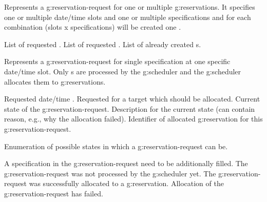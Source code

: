 \begin{Api}
Represents a \gls{g:reservation-request} for one or multiple \glspl{g:reservation}. It specifies one or multiple date/time slots and one or multiple specifications and for each combination (slots x specifications) will be created one .
\begin{ApiClassAttributes}
 List of requested .
 List of requested .
 List of already created s.
\end{ApiClassAttributes}

Represents a \gls{g:reservation-request} for single specification at one specific date/time slot.
Only s are processed by the \gls{g:scheduler} and the \gls{g:scheduler} allocates them to \glspl{g:reservation}. 
\begin{ApiClassAttributes}
 Requested date/time .
 Requested  for a target which should be allocated.
 Current state of the \gls{g:reservation-request}.
 Description for the current state (can contain reason, e.g., why the allocation failed).
 Identifier of allocated \gls{g:reservation} for this \gls{g:reservation-request}.
\end{ApiClassAttributes}

Enumeration of possible states in which a \gls{g:reservation-request} can be.
\begin{ApiEnumValues}
 A specification in the \gls{g:reservation-request} need to be additionally filled.
 The \gls{g:reservation-request} was not processed by the \gls{g:scheduler} yet.
 The \gls{g:reservation-request} was successfully allocated to a \gls{g:reservation}.
 Allocation of the \gls{g:reservation-request} has failed.
\end{ApiEnumValues}


\end{Api}
